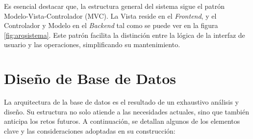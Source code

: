 Es esencial destacar que, la estructura general del sistema sigue el patrón Modelo-Vista-Controlador (MVC). La Vista reside en el \textit{Frontend}, y el Controlador y Modelo en el \textit{Backend} tal como se puede ver en la figura \ref{fig:arqsistema}. Este patrón facilita la distinción entre la lógica de la interfaz de usuario y las operaciones, simplificando su mantenimiento.

\section{Diseño de Base de Datos}

La arquitectura de la base de datos es el resultado de un exhaustivo análisis y diseño. Su estructura no solo atiende a las necesidades actuales, sino que también anticipa los retos futuros. A continuación, se detallan algunos de los elementos clave y las consideraciones adoptadas en su construcción:

